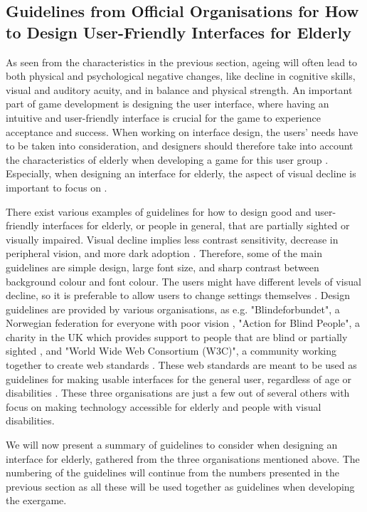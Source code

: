 \begin{enumerate}[{g}.1]
\section{Guidelines from Official Organisations for How to Design User-Friendly Interfaces for Elderly}
\label{sec:designelderly}

As seen from the characteristics in the previous section, ageing will often lead to both physical and psychological negative changes, like decline in cognitive skills, visual and auditory acuity, and in balance and physical strength. An important part of game development is designing the user interface, where having an intuitive and user-friendly interface is crucial for the game to experience acceptance and success.  When working on interface design, the users' needs have to be taken into consideration, and designers should therefore take into account the characteristics of elderly when developing a game for this user group \cite{mmi}. Especially, when designing an interface for elderly, the aspect of visual decline is important to focus on \cite{blindeforbundetTekst}. 

There exist various examples of guidelines for how to design good and user-friendly interfaces for elderly, or people in general, that are partially sighted or visually impaired. Visual decline implies less contrast sensitivity, decrease in peripheral vision, and more dark adoption \cite{ijsselsteijn2007digital}. Therefore, some of the main guidelines are simple design, large font size, and sharp contrast between background colour and font colour. The users might have different levels of visual decline, so it is preferable to allow users to change settings themselves \cite{blindeforbundetTekst} \cite{actionforblindpeopleTekst} \cite{w3cTekst}. Design guidelines are provided by various organisations, as e.g. "Blindeforbundet", a Norwegian federation for everyone with poor vision \cite{blindeforbundet}, "Action for Blind People", a charity in the UK which provides support to people that are blind or partially sighted \cite{actionforblindpeople}, and "World Wide Web Consortium (W3C)", a community working together to create web standards \cite{w3c}. These web standards are meant to be used as guidelines for making usable interfaces for the general user, regardless of age or disabilities \cite{w3cTekst}. These three organisations are just a few out of several others with focus on making technology accessible for elderly and people with visual disabilities. 

We will now present a summary of guidelines to consider when designing an interface for elderly, gathered from the three organisations mentioned above. The numbering of the guidelines will continue from the numbers presented in the previous section as all these will be used together as guidelines when developing the exergame.



\end{enumerate}

